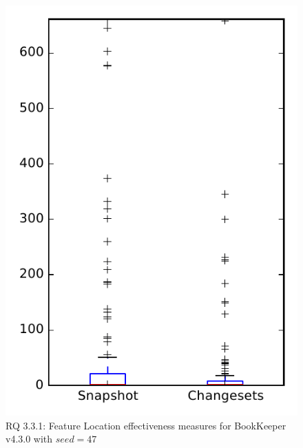 
\begin{figure}
\centering
\includegraphics[height=0.4\textheight]{figures/flt_seed/rq1_bookkeeper_47}
\caption{RQ 3.3.1: Feature Location effectiveness measures for BookKeeper v4.3.0 with $seed=47$}
\label{fig:flt_seed:rq1:bookkeeper}
\end{figure}
